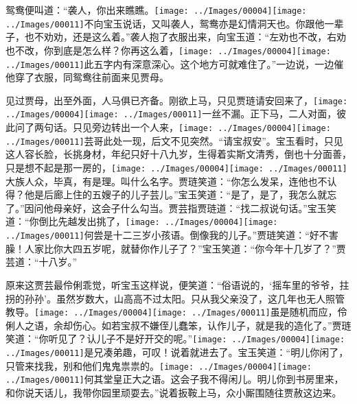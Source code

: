 鸳鸯便叫道：``袭人，你出来瞧瞧。{\texttt{[image: ../Images/00004]}\texttt{[image: ../Images/00011]}\footnotesize \kaishu 不向宝玉说话，又叫袭人，鸳鸯亦是幻情洞天也。}你跟他一辈子，也不劝劝，还是这么着。''袭人抱了衣服出来，向宝玉道：``左劝也不改，右劝也不改，你到底是怎么样？你再这么着，{\texttt{[image: ../Images/00004]}\texttt{[image: ../Images/00011]}\footnotesize \kaishu 此五字内有深意深心。}这个地方可就难住了。''一边说，一边催他穿了衣服，同鸳鸯往前面来见贾母。

见过贾母，出至外面，人马俱已齐备。刚欲上马，只见贾琏请安回来了，{\texttt{[image: ../Images/00004]}\texttt{[image: ../Images/00011]}\footnotesize \kaishu 一丝不漏。}正下马，二人对面，彼此问了两句话。只见旁边转出一个人来，{\texttt{[image: ../Images/00004]}\texttt{[image: ../Images/00011]}\footnotesize \kaishu 芸哥此处一现，后文不见突然。}``请宝叔安''。宝玉看时，只见这人容长脸，长挑身材，年纪只好十八九岁，生得着实斯文清秀，倒也十分面善，只是想不起是那一房的，{\texttt{[image: ../Images/00004]}\texttt{[image: ../Images/00011]}\footnotesize \kaishu 大族人众，毕真，有是理。}叫什么名字。贾琏笑道：``你怎么发呆，连他也不认得？他是后廊上住的五嫂子的儿子芸儿。''宝玉笑道：``是了，是了，我怎么就忘了。''因问他母亲好，这会子什么勾当。贾芸指贾琏道：``找二叔说句话。''宝玉笑道：``你倒比先越发出挑了，{\texttt{[image: ../Images/00004]}\texttt{[image: ../Images/00011]}\footnotesize \kaishu 何尝是十二三岁小孩语。}倒像我的儿子。''贾琏笑道：``好不害臊！人家比你大四五岁呢，就替你作儿子了？''宝玉笑道：``你今年十几岁了？''贾芸道：``十八岁。''

原来这贾芸最伶俐乖觉，听宝玉这样说，便笑道：``俗语说的，`摇车里的爷爷，拄拐的孙孙'。虽然岁数大，山高高不过太阳。只从我父亲没了，这几年也无人照管教导。{\texttt{[image: ../Images/00004]}\texttt{[image: ../Images/00011]}\footnotesize \kaishu 虽是随机而应，伶俐人之语，余却伤心。}如若宝叔不嫌侄儿蠢笨，认作儿子，就是我的造化了。''贾琏笑道：``你听见了？认儿子不是好开交的呢。''{\texttt{[image: ../Images/00004]}\texttt{[image: ../Images/00011]}\footnotesize \kaishu 是兄凑弟趣，可叹！}说着就进去了。宝玉笑道：``明儿你闲了，只管来找我，别和他们鬼鬼祟祟的。{\texttt{[image: ../Images/00004]}\texttt{[image: ../Images/00011]}\footnotesize \kaishu 何其堂皇正大之语。}这会子我不得闲儿。明儿你到书房里来，和你说天话儿，我带你园里顽耍去。''说着扳鞍上马，众小厮围随往贾赦这边来。

